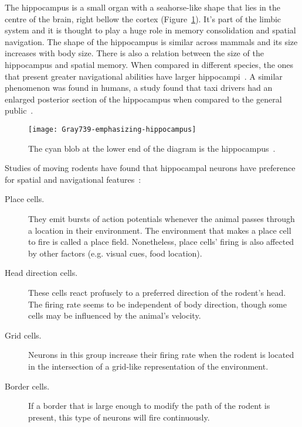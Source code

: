 The hippocampus is a small organ with a seahorse-like shape that lies in the centre of the brain, right bellow the cortex (Figure~\ref{fig:brain:hippo}). It's part of the limbic system and it is thought to play a huge role in memory consolidation and spatial navigation.
The shape of the hippocampus is similar across mammals and its size increases with body size. There is also a relation between the size of the hippocampus and spatial memory. When compared in different species, the ones that present greater navigational abilities have larger hippocampi~\cite{jacobs2003evolution}. A similar phenomenon was found in humans, a study found that taxi drivers had an enlarged posterior section of the hippocampus when compared to the general public~\cite{taxi-maguire}.

\begin{figure}[h]
  \begin{center}
    \texttt{[image: Gray739-emphasizing-hippocampus]}
    \caption{The cyan blob at the lower end of the diagram is the hippocampus~\cite{wikipedia-images}. }
    \label{fig:brain:hippo}
  \end{center}
\end{figure}

Studies of moving rodents have found that hippocampal neurons have preference for spatial and navigational features~\cite{okeefe1971hippocampus,milford2010robot}:
\begin{description}
  \item[Place cells.] They emit bursts of action potentials whenever the animal passes through a location in their environment. The environment that makes a place cell to fire is called a place field. Nonetheless, place cells' firing is also affected by other factors (e.g. visual cues, food location).
  \item[Head direction cells.] These cells react profusely to a preferred direction of the rodent's head. The firing rate seems to be independent of body direction, though some cells may be influenced by the animal's velocity.
  \item[Grid cells.] Neurons in this group increase their firing rate when the rodent is located in the intersection of a grid-like representation of the environment.
  \item[Border cells.] If a border that is large enough to modify the path of the rodent is present, this type of neurons will fire continuously.
\end{description}

